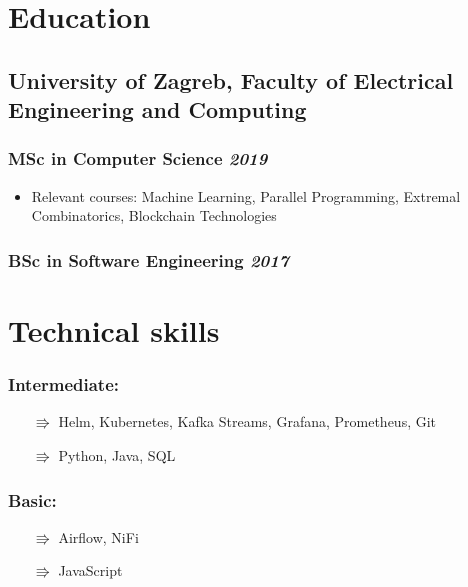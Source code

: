 \documentclass[a4paper]{article}
\newcommand{\bolditalicpair}
[2]
{\textbf{#1} \texorpdfstring{\hfill}{} \textit{#2}}
\begin{document}
\section{Education}
\subsection{\bolditalicpair{University of Zagreb, Faculty of Electrical Engineering and Computing}{}}

\subsubsection{\bolditalicpair{MSc in Computer Science}{2019}}

\begin{itemize}
  \item Relevant courses: Machine Learning, Parallel Programming, Extremal Combinatorics, Blockchain Technologies %
\end{itemize}

\subsubsection{\bolditalicpair{BSc in Software Engineering}{2017}}



\section{Technical skills}
\subsubsection{\bolditalicpair{Intermediate:}{}}

\begin{itemize}
  \item[$\Rrightarrow$] Helm, Kubernetes, Kafka Streams, Grafana, Prometheus, Git
  \item[$\Rrightarrow$] Python, Java, SQL
\end{itemize}

\subsubsection{\bolditalicpair{Basic:}{}}

\begin{itemize}
  \item[$\Rrightarrow$] Airflow, NiFi
  \item[$\Rrightarrow$] JavaScript
\end{itemize}
\end{document}
